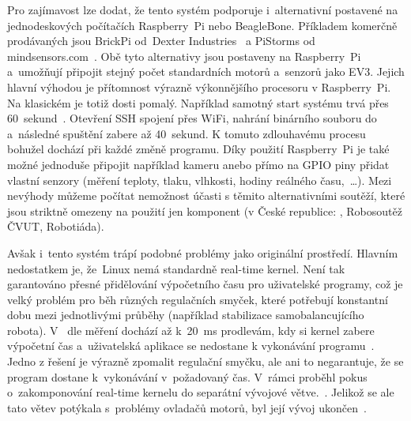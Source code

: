Pro zajímavost lze dodat, že tento systém podporuje i~alternativní  postavené na jednodeskových počítačích Raspberry~Pi nebo BeagleBone. Příkladem komerčně prodávaných  jsou BrickPi od~Dexter Industries~\cite{lego_dexterindustries_brickpi} a PiStorms od mindsensors.com~\cite{lego_mindsensor_pistorms}.
Obě tyto alternativy jsou postaveny na Raspberry~Pi a~umožňují připojit stejný počet standardních \lego{} motorů a~senzorů jako EV3.
Jejich hlavní výhodou je přítomnost výrazně výkonnějšího procesoru v Raspberry~Pi. Na klasickém  je totiž \evThreeDev{} dosti pomalý. 
Například samotný start systému trvá přes 60~sekund~\cite{legoMindstormsEV3_ev3dev_video-system-boot}. 
Otevření SSH spojení přes WiFi, nahrání binárního souboru do  a~následné spuštění zabere až 40~sekund. 
K tomuto zdlouhavému procesu bohužel dochází při každé změně programu. 
Díky použití Raspberry~Pi je také možné jednoduše připojit například kameru anebo přímo na GPIO piny přidat vlastní senzory (měření teploty, tlaku, vlhkosti, hodiny reálného času,~\dots).  
Mezi nevýhody můžeme počítat nemožnost účasti s těmito alternativními  soutěží, které jsou striktně omezeny na použití jen \lego{} komponent (v České republice: \fll{}, Robosoutěž ČVUT, Robotiáda).

Avšak i~tento systém trápí podobné problémy jako originální \lego{} prostředí. 
Hlavním nedostatkem je, že~Linux nemá standardně real-time kernel. 
Není tak garantováno přesné přidělování výpočetního času pro uživatelské programy, což je velký problém pro běh různých regulačních smyček, které potřebují konstantní dobu mezi jednotlivými průběhy (například stabilizace samobalancujícího robota). 
V~\evThreeDev{} dle měření dochází až k~20~ms prodlevám, kdy si kernel zabere výpočetní čas a~uživatelská aplikace se nedostane k vykonávání programu~\cite{legoMindstormsEV3_ev3dev-issue_constant-loop-time}. 
Jedno z řešení je výrazně zpomalit regulační smyčku, ale ani to negarantuje, že se program dostane k~vykonávání v~požadovaný čas.
V~rámci \evThreeDev{} proběhl pokus o~zakomponování real-time kernelu do separátní vývojové větve.~\cite{legoMindstormsEV3_ev3dev-rt-kernel-start}. 
Jelikož se ale tato větev potýkala s~problémy ovladačů motorů, byl její vývoj ukončen~\cite{legoMindstormsEV3_ev3dev-rt-kernel-end}.  


